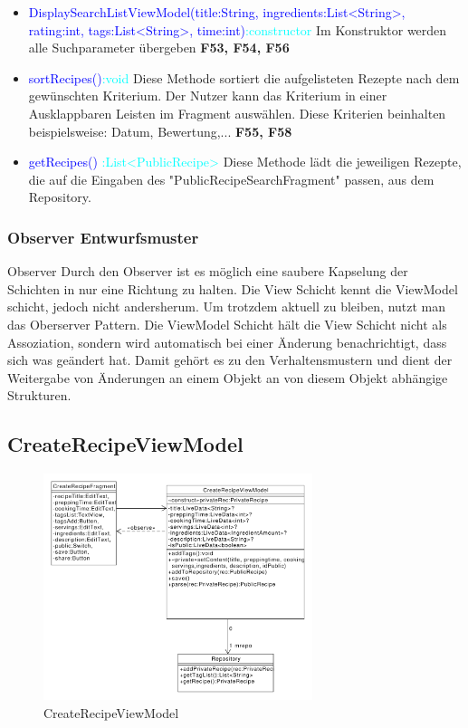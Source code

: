 \begin{itemize}
	\item \textcolor{blue}{DisplaySearchListViewModel(title:String, ingredients:List<String>, rating:int, tags:List<String>, time:int)}\textcolor{cyan}{:constructor} Im Konstruktor werden alle Suchparameter übergeben \textbf{F53, F54, F56}
	
	\item \textcolor{blue}{sortRecipes()}\textcolor{cyan}{:void} Diese Methode sortiert die aufgelisteten Rezepte nach dem gewünschten Kriterium. Der Nutzer kann das Kriterium in einer Ausklappbaren Leisten im Fragment auswählen. Diese Kriterien beinhalten beispielsweise: Datum, Bewertung,... \textbf{F55, F58} 
	
	\item \textcolor{blue}{getRecipes()} \textcolor{cyan}{:List<PublicRecipe>} Diese Methode lädt die jeweiligen Rezepte, die auf die Eingaben des "PublicRecipeSearchFragment" passen, aus dem Repository.
\end{itemize}

\subsubsection{Observer Entwurfsmuster}
Observer
Durch den Observer ist es möglich eine saubere Kapselung der Schichten in nur eine Richtung zu halten. Die View Schicht kennt die ViewModel schicht, jedoch nicht andersherum. Um trotzdem aktuell zu bleiben, nutzt man das Oberserver Pattern. Die ViewModel Schicht hält die View Schicht nicht als Assoziation, sondern wird automatisch bei einer Änderung benachrichtigt, dass sich was geändert hat. Damit gehört es zu den Verhaltensmustern und dient der Weitergabe von Änderungen an einem Objekt an von diesem Objekt abhängige Strukturen.




\subsection{CreateRecipeViewModel}
\begin{figure}[H]
	\centering
	\includegraphics[width=0.7\textwidth]{pics/viewModel/Create_Recipe_ViewModel.pdf}%
	\caption{CreateRecipeViewModel}%
	\label{viewModel}%
\end{figure}

